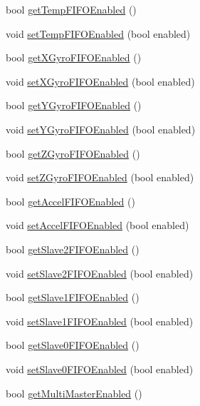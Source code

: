 \begin{DoxyCompactItemize}
bool \mbox{\hyperlink{classMPU6050_a913c2095001e204b5b09f8382a86d2ca}{get\+Temp\+F\+I\+F\+O\+Enabled}} ()
\item 
void \mbox{\hyperlink{classMPU6050_ae528a25b4997ad0e3091a012e4e4419e}{set\+Temp\+F\+I\+F\+O\+Enabled}} (bool enabled)
\item 
bool \mbox{\hyperlink{classMPU6050_ada9a553176b57815f23fb7d71bb85c9d}{get\+X\+Gyro\+F\+I\+F\+O\+Enabled}} ()
\item 
void \mbox{\hyperlink{classMPU6050_a53a03d1f255a62f01375c870cdc85767}{set\+X\+Gyro\+F\+I\+F\+O\+Enabled}} (bool enabled)
\item 
bool \mbox{\hyperlink{classMPU6050_a86c85d5b5c93df82394435b868e17463}{get\+Y\+Gyro\+F\+I\+F\+O\+Enabled}} ()
\item 
void \mbox{\hyperlink{classMPU6050_a16eb12bbf07bc17a9d852941d834175e}{set\+Y\+Gyro\+F\+I\+F\+O\+Enabled}} (bool enabled)
\item 
bool \mbox{\hyperlink{classMPU6050_adbbbd131c74f37dd545403633eb317ff}{get\+Z\+Gyro\+F\+I\+F\+O\+Enabled}} ()
\item 
void \mbox{\hyperlink{classMPU6050_af5b5bc39b66466ba910f6eef1259444c}{set\+Z\+Gyro\+F\+I\+F\+O\+Enabled}} (bool enabled)
\item 
bool \mbox{\hyperlink{classMPU6050_ace244415128ad7a38293ad6808b7face}{get\+Accel\+F\+I\+F\+O\+Enabled}} ()
\item 
void \mbox{\hyperlink{classMPU6050_afccbee85f5cdc95098f6d62d8d417c3f}{set\+Accel\+F\+I\+F\+O\+Enabled}} (bool enabled)
\item 
bool \mbox{\hyperlink{classMPU6050_a3c2e29508607a655221a2fa4f4219b4d}{get\+Slave2\+F\+I\+F\+O\+Enabled}} ()
\item 
void \mbox{\hyperlink{classMPU6050_a38a10ac4f30b96718ec021dc0db8587b}{set\+Slave2\+F\+I\+F\+O\+Enabled}} (bool enabled)
\item 
bool \mbox{\hyperlink{classMPU6050_afd6a9b55a589c83c9a0fb0b5b2a88234}{get\+Slave1\+F\+I\+F\+O\+Enabled}} ()
\item 
void \mbox{\hyperlink{classMPU6050_a5d432fa2fb8b2227f50aa5c7b5befb66}{set\+Slave1\+F\+I\+F\+O\+Enabled}} (bool enabled)
\item 
bool \mbox{\hyperlink{classMPU6050_a6aa7aa2e3fac06f8b5ab9ee127255a5e}{get\+Slave0\+F\+I\+F\+O\+Enabled}} ()
\item 
void \mbox{\hyperlink{classMPU6050_a97fbf27e1b827f9dfc3c28ff376b54c4}{set\+Slave0\+F\+I\+F\+O\+Enabled}} (bool enabled)
\item 
bool \mbox{\hyperlink{classMPU6050_aa88483068837bd9bc9c9f6c59a7a79b7}{get\+Multi\+Master\+Enabled}} ()

\end{DoxyCompactItemize}
